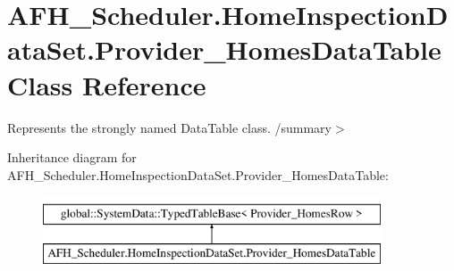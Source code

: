 \section{A\+F\+H\+\_\+\+Scheduler.\+Home\+Inspection\+Data\+Set.\+Provider\+\_\+\+Homes\+Data\+Table Class Reference}
\label{class_a_f_h___scheduler_1_1_home_inspection_data_set_1_1_provider___homes_data_table}


Represents the strongly named Data\+Table class. /summary$>$  


Inheritance diagram for A\+F\+H\+\_\+\+Scheduler.\+Home\+Inspection\+Data\+Set.\+Provider\+\_\+\+Homes\+Data\+Table\+:\begin{figure}[H]
\begin{center}
\leavevmode
\includegraphics[height=2.000000cm]{class_a_f_h___scheduler_1_1_home_inspection_data_set_1_1_provider___homes_data_table}
\end{center}
\end{figure}
